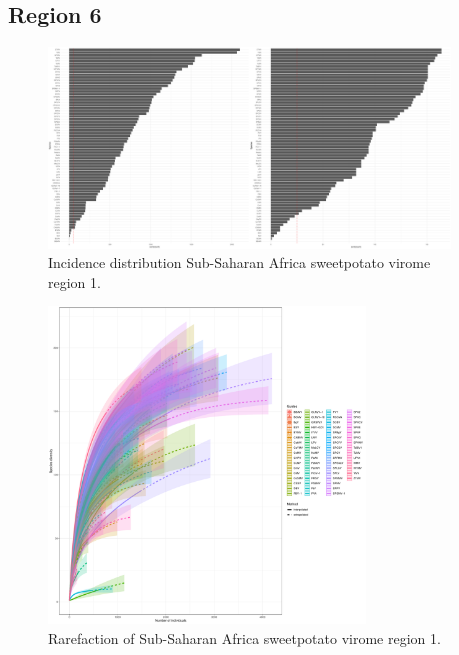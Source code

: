 \documentclass{article}
\begin{document}
\subsection{Region 6}

\begin{figure}[h!]
\begin{center}
\includegraphics[width=0.95\textwidth]{../results/k-cluster6/6-kcluster_incidence_w+bFeb28.pdf
} %
\caption{Incidence distribution Sub-Saharan Africa sweetpotato virome region 1.}
\end{center}
\end{figure}


\begin{figure}[h!]
\begin{center}
\includegraphics[width=0.75\textwidth]{../results/k-cluster6/6-kcluster_rarefaction-iNEXT_Feb28.pdf
} %
\caption{Rarefaction of Sub-Saharan Africa sweetpotato virome region 1.}
\end{center}
\end{figure}
\end{document}

